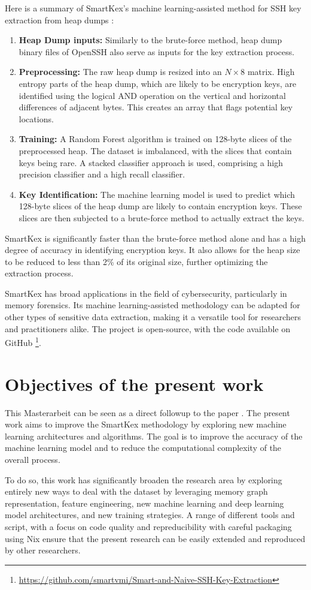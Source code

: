     Here is a summary of SmartKex's machine learning-assisted method for SSH key extraction from heap dumps \cite{SmartKex22}:

    \begin{enumerate}
        \item \textbf{Heap Dump inputs:} Similarly to the brute-force method, heap dump binary files of OpenSSH also serve as inputs for the key extraction process.
        \item \textbf{Preprocessing:} The raw heap dump is resized into an $N \times 8$ matrix. High entropy parts of the heap dump, which are likely to be encryption keys, are identified using the logical AND operation on the vertical and horizontal differences of adjacent bytes. This creates an array that flags potential key locations.
        \item \textbf{Training:} A Random Forest algorithm is trained on 128-byte slices of the preprocessed heap. The dataset is imbalanced, with the slices that contain keys being rare. A stacked classifier approach is used, comprising a high precision classifier and a high recall classifier.
        \item \textbf{Key Identification:} The machine learning model is used to predict which 128-byte slices of the heap dump are likely to contain encryption keys. These slices are then subjected to a brute-force method to actually extract the keys.
    \end{enumerate}
    
SmartKex is significantly faster than the brute-force method alone and has a high degree of accuracy in identifying encryption keys. It also allows for the heap size to be reduced to less than 2\% of its original size, further optimizing the extraction process.

SmartKex has broad applications in the field of cybersecurity, particularly in memory forensics. Its machine learning-assisted methodology can be adapted for other types of sensitive data extraction, making it a versatile tool for researchers and practitioners alike. The project is open-source, with the code available on GitHub \footnote{\url{https://github.com/smartvmi/Smart-and-Naive-SSH-Key-Extraction}}.

\section{Objectives of the present work}
This Masterarbeit can be seen as a direct followup to the paper . The present work aims to improve the SmartKex methodology by exploring new machine learning architectures and algorithms. The goal is to improve the accuracy of the machine learning model and to reduce the computational complexity of the overall process.

To do so, this work has significantly broaden the research area by exploring entirely new ways to deal with the dataset by leveraging memory graph representation, feature engineering, new machine learning and deep learning model architectures, and new training strategies. A range of different tools and script, with a focus on code quality and repreducibility with careful packaging using Nix ensure that the present research can be easily extended and reproduced by other researchers.
